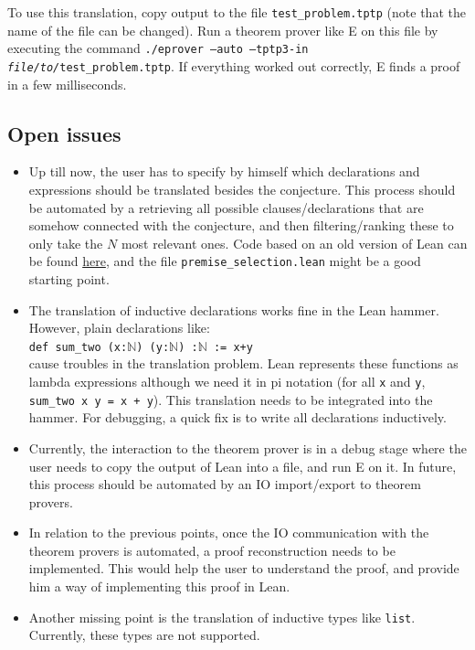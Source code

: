 \documentclass[a4paper]{article}
\begin{document}
To use this translation, copy output to the file \texttt{test\_problem.tptp} (note that the name of the file can be changed).
Run a theorem prover like E \cite{EProver} on this file by executing the command \texttt{./eprover --auto --tptp3-in \textit{file/to/}test\_problem.tptp}. If everything worked out correctly, E finds a proof in a few milliseconds.
\subsection{Open issues}
\begin{itemize}
	\item Up till now, the user has to specify by himself which declarations and expressions should be translated besides the conjecture. This process should be automated by a retrieving all possible clauses/declarations that are somehow connected with the conjecture, and then filtering/ranking these to only take the $N$ most relevant ones. Code based on an old version of Lean can be found \href{https://github.com/robertylewis/relevance_filter/tree/dev_lean_reparam}{here}, and the file \texttt{premise\_selection.lean} might be a good starting point.
	\item The translation of inductive declarations works fine in the Lean hammer. However, plain declarations like:\\
	\texttt{def sum\_two (x:$\mathbb{N}$) (y:$\mathbb{N}$) :$\mathbb{N}$ := x+y}\\
	cause troubles in the translation problem. Lean represents these functions as lambda expressions although we need it in pi notation (for all \texttt{x} and \texttt{y}, \texttt{sum\_two x y = x + y}). This translation needs to be integrated into the hammer. For debugging, a quick fix is to write all declarations inductively.
	\item Currently, the interaction to the theorem prover is in a debug stage where the user needs to copy the output of Lean into a file, and run E on it. In future, this process should be automated by an IO import/export to theorem provers.
	\item In relation to the previous points, once the IO communication with the theorem provers is automated, a proof reconstruction needs to be implemented. This would help the user to understand the proof, and provide him a way of implementing this proof in Lean.
	\item Another missing point is the translation of inductive types like \texttt{list}. Currently, these types are not supported.
\end{itemize}
\end{document}
